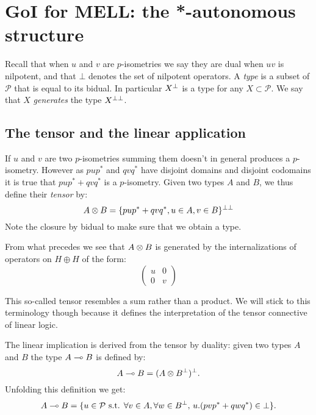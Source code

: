 \section{GoI for MELL: the *-autonomous structure}\label{goi-for-mell-the--autonomous-structure}

Recall that when \(u\) and \(v\) are \(p\)-isometries we say they are
dual when \(uv\) is nilpotent, and that \(\bot\) denotes the set of
nilpotent operators. A \emph{type} is a subset of \(\mathcal{P}\) that
is equal to its bidual. In particular \(X^\bot\) is a type for any
\(X\subset\mathcal{P}\). We say that \(X\) \emph{generates} the type
\(X^{\bot\bot}\).

\subsection{The tensor and the linear application}\label{the-tensor-and-the-linear-application}

If \(u\) and \(v\) are two \(p\)-isometries summing them doesn't in
general produces a \(p\)-isometry. However as \(pup^*\) and \(qvq^*\)
have disjoint domains and disjoint codomains it is true that
\(pup^* + qvq^*\) is a \(p\)-isometry. Given two types \(A\) and \(B\),
we thus define their \emph{tensor} by:
\begin{equation*}
A\otimes B = \{pup^* + qvq^*, u\in A, v\in B\}^{\bot\bot}
\end{equation*}
Note the closure by bidual to make sure that we obtain a type.

From what precedes we see that \(A\otimes B\) is generated by the
internalizations of operators on \(H\oplus H\) of the form:
\begin{equation*}
\begin{pmatrix}
  u & 0 \\
  0 & v
\end{pmatrix}
\end{equation*}

\begin{remark}
This so-called tensor resembles a sum rather than a product. We will stick to this terminology though because it defines the interpretation of the tensor connective of linear logic.
\end{remark}

The linear implication is derived from the tensor by duality: given two
types \(A\) and \(B\) the type \(A\multimap B\) is defined by:
\begin{equation*}
A\multimap B = (A\otimes B^\bot)^\bot.
\end{equation*}
Unfolding this definition we get:
\begin{equation*}
A\multimap B = \{u\in\mathcal{P}\text{ s.t. } \forall v\in A, \forall w\in B^\bot,\, u.(pvp^* + qwq^*) \in\bot\}.
\end{equation*}

